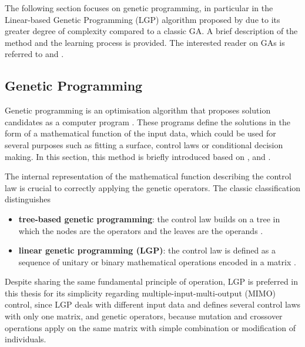 The following section focuses on genetic programming, in particular in the Linear-based Genetic Programming (LGP) algorithm proposed by \citet{li2017GP} due to its greater degree of complexity compared to a classic GA. A brief description of the method and the learning process is provided. The interested reader on GAs is referred to \citet{holland1992adaptation} and \citet{Wahde2008book}.

\subsection{Genetic Programming}\label{ss:GP}
%
Genetic programming is an optimisation algorithm that proposes solution candidates as a computer program \citep{Koza1994gp}. These programs define the solutions in the form of a mathematical function of the input data, which could be used for several purposes such as fitting a surface, control laws or conditional decision making. In this section, this method is briefly introduced based on \citet{Wahde2008book}, \citet{duriez2017book} and \citet{cornejomacedaPhD}.

The internal representation of the mathematical function describing the control law is crucial to correctly applying the genetic operators. The classic classification distinguishes
%
\begin{itemize}
    \item \textbf{tree-based genetic programming}: the control law builds on a tree in which the nodes are the operators and the leaves are the operands \citep{duriez2017book}.
    \item \textbf{linear genetic programming (LGP)}: the control law is defined as a sequence of unitary or binary mathematical operations encoded in a matrix \citep{brameier2007linear}.
\end{itemize}
%
Despite sharing the same fundamental principle of operation, LGP is preferred in this thesis for its simplicity regarding multiple-input-multi-output (MIMO) control, since LGP deals with different input data and defines several control laws with only one matrix, and genetic operators, because mutation and crossover operations apply on the same matrix with simple combination or modification of individuals.

